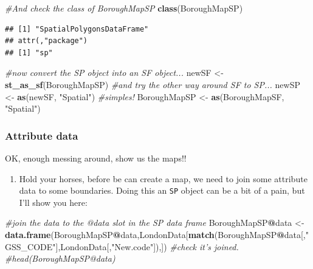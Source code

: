 \documentclass[]{book}
\newenvironment{Shaded}{\begin{snugshade}}{\end{snugshade}}
\newcommand{\CommentTok}[1]{\textcolor[rgb]{0.56,0.35,0.01}{\textit{#1}}}
\newcommand{\KeywordTok}[1]{\textcolor[rgb]{0.13,0.29,0.53}{\textbf{#1}}}
\newcommand{\NormalTok}[1]{#1}
\newcommand{\OperatorTok}[1]{\textcolor[rgb]{0.81,0.36,0.00}{\textbf{#1}}}
\newcommand{\StringTok}[1]{\textcolor[rgb]{0.31,0.60,0.02}{#1}}
\providecommand{\tightlist}{%
  \setlength{\itemsep}{0pt}\setlength{\parskip}{0pt}}
\begin{document}
\begin{Shaded}
\begin{Highlighting}[]
\CommentTok{#And check the class of BoroughMapSP}
\KeywordTok{class}\NormalTok{(BoroughMapSP)}
\end{Highlighting}
\end{Shaded}

\begin{verbatim}
## [1] "SpatialPolygonsDataFrame"
## attr(,"package")
## [1] "sp"
\end{verbatim}

\begin{Shaded}
\begin{Highlighting}[]
\CommentTok{#now convert the SP object into an SF object...}
\NormalTok{newSF <-}\StringTok{ }\KeywordTok{st_as_sf}\NormalTok{(BoroughMapSP)}
\CommentTok{#and try the other way around SF to SP...}
\NormalTok{newSP <-}\StringTok{ }\KeywordTok{as}\NormalTok{(newSF, }\StringTok{"Spatial"}\NormalTok{)}
\CommentTok{#simples!}
\NormalTok{BoroughMapSP <-}\StringTok{ }\KeywordTok{as}\NormalTok{(BoroughMapSF, }\StringTok{"Spatial"}\NormalTok{)}
\end{Highlighting}
\end{Shaded}

\hypertarget{attribute-data}{%
\subsubsection{Attribute data}\label{attribute-data}}

OK, enough messing around, show us the maps!!

\begin{enumerate}
\def\labelenumi{\arabic{enumi}.}
\setcounter{enumi}{8}
\tightlist
\item
  Hold your horses, before be can create a map, we need to join some attribute data to some boundaries. Doing this an \texttt{SP} object can be a bit of a pain, but I'll show you here:
\end{enumerate}

\begin{Shaded}
\begin{Highlighting}[]
\CommentTok{#join the data to the @data slot in the SP data frame}
\NormalTok{BoroughMapSP}\OperatorTok{@}\NormalTok{data <-}\StringTok{ }\KeywordTok{data.frame}\NormalTok{(BoroughMapSP}\OperatorTok{@}\NormalTok{data,LondonData[}\KeywordTok{match}\NormalTok{(BoroughMapSP}\OperatorTok{@}\NormalTok{data[,}\StringTok{"GSS_CODE"}\NormalTok{],LondonData[,}\StringTok{"New.code"}\NormalTok{]),])}
\CommentTok{#check it's joined.}
\CommentTok{#head(BoroughMapSP@data)}
\end{Highlighting}
\end{Shaded}
\end{document}
